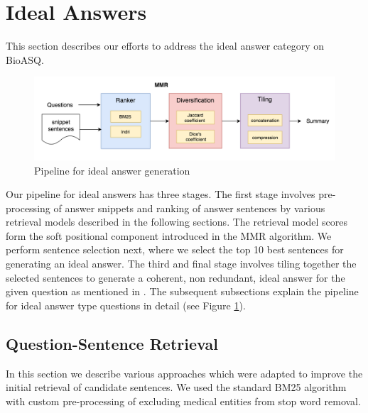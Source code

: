 \documentclass[11pt,a4paper]{article}
\begin{document}
\section{Ideal Answers}
\label{approach1}
This section describes our efforts to address the ideal answer category on BioASQ. %

 \begin{figure}
     \centering
     \includegraphics[scale=0.3]{images/pipeline_summary.png}
     \caption{Pipeline for ideal answer generation}
     \label{fig:ideal_answers_pipeline}
 \end{figure}

Our pipeline for ideal answers has three stages. The first stage involves pre-processing of answer snippets and ranking of answer sentences by various retrieval models described in the following sections. The retrieval model scores form the soft positional component introduced in the MMR algorithm. We perform sentence selection next, where we select the top 10 best sentences for generating an ideal answer. The third and final stage involves tiling together the selected sentences to generate a coherent, non redundant, ideal answer for the given question as mentioned in \cite{khyati-paper}. 
The subsequent subsections explain the pipeline for ideal answer type questions in detail (see Figure \ref{fig:ideal_answers_pipeline}).
\subsection{Question-Sentence Retrieval}
In this section we describe various approaches which were adapted to improve the initial retrieval of candidate sentences. We used the standard BM25 algorithm with custom pre-processing of excluding medical entities from stop word removal.  
\end{document}

